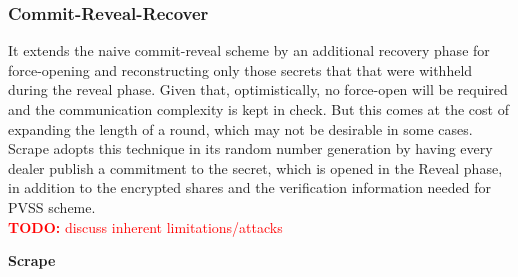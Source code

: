 \documentclass[letterpaper,twocolumn,10pt]{article}
\theoremstyle{definition}
\theoremstyle{remark}
\newcommand{\todo}[1]{\textcolor{red}{\textbf{TODO:} #1}}
\begin{document}
\subsubsection{Commit-Reveal-Recover}
It extends the naive commit-reveal scheme by an additional recovery phase for
force-opening and reconstructing only those secrets that that were withheld during the reveal phase. Given that, optimistically, no force-open will be required and the communication complexity is kept in check. But this comes at the cost of expanding the length of a round, which may not be desirable in some cases. Scrape adopts this technique in its random number generation by having every dealer publish a commitment to the secret, which is opened in the Reveal phase, in addition to the encrypted shares and the verification information needed for PVSS scheme.\\

\todo{discuss inherent limitations/attacks}

\textbf{Scrape}\\
\end{document}
